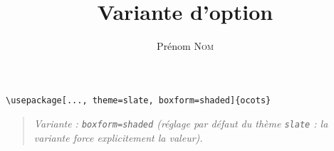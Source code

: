 \documentclass[11pt]{ocots-book}
\title{Variante d'option}
\author{Prénom \textsc{Nom}}
\newcommand{\ocotsvariantnote}[1]{\begin{quote}\itshape Variante : #1\end{quote}}
\begin{document}
\maketitle

\begin{lstlisting}
\usepackage[..., theme=slate, boxform=shaded]{ocots}
\end{lstlisting}
\ocotsvariantnote{\texttt{boxform=shaded} (r\'eglage par d\'efaut du th\`eme \texttt{slate} : la variante force explicitement la valeur).}

\end{document}
